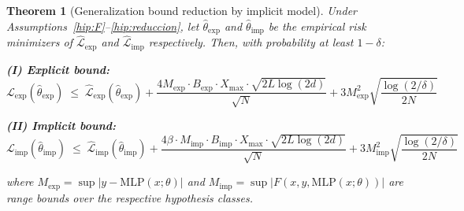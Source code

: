 \documentclass[12pt]{article}
\newtheorem{theorem}{Theorem}
\newcommand{\MLP}{\mathrm{MLP}}
\begin{document}
\begin{theorem}[Generalization bound reduction by implicit model]
\label{teo:principal}
Under Assumptions~\ref{hip:F}--\ref{hip:reduccion}, let
$\hat{\theta}_{\mathrm{exp}}$ and
$\hat{\theta}_{\mathrm{imp}}$ be the empirical risk minimizers of
$\hat{\mathcal{L}}_{\mathrm{exp}}$ and
$\hat{\mathcal{L}}_{\mathrm{imp}}$ respectively.
Then, with probability at least $1 - \delta$:

\medskip

\textbf{(I) Explicit bound:}
\begin{equation}
  \mathcal{L}_{\mathrm{exp}}(\hat{\theta}_{\mathrm{exp}})
  \;\le\; \hat{\mathcal{L}}_{\mathrm{exp}}(\hat{\theta}_{\mathrm{exp}})
  + \frac{4 M_{\mathrm{exp}} \cdot B_{\mathrm{exp}} \cdot X_{\max}
    \cdot \sqrt{2L\log(2d)}}{\sqrt{N}}
  + 3 M_{\mathrm{exp}}^2
    \sqrt{\frac{\log(2/\delta)}{2N}}
  \label{eq:cota_exp}
\end{equation}

\textbf{(II) Implicit bound:}
\begin{equation}
  \mathcal{L}_{\mathrm{imp}}(\hat{\theta}_{\mathrm{imp}})
  \;\le\; \hat{\mathcal{L}}_{\mathrm{imp}}(\hat{\theta}_{\mathrm{imp}})
  + \frac{4 \beta \cdot M_{\mathrm{imp}} \cdot B_{\mathrm{imp}}
    \cdot X_{\max} \cdot \sqrt{2L\log(2d)}}{\sqrt{N}}
  + 3 M_{\mathrm{imp}}^2
    \sqrt{\frac{\log(2/\delta)}{2N}}
  \label{eq:cota_imp}
\end{equation}

\noindent where
$M_{\mathrm{exp}} = \sup |y - \MLP(x;\theta)|$ and
$M_{\mathrm{imp}} = \sup |F(x,y,\MLP(x;\theta))|$ are
range bounds over the respective hypothesis classes.
\end{theorem}
\end{document}
